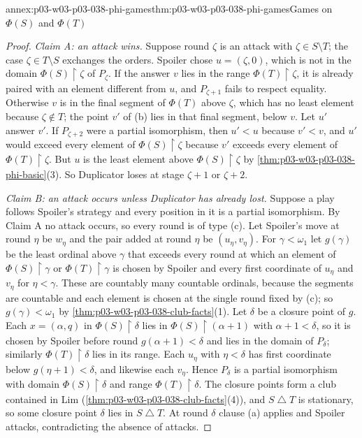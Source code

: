 \begin{annexitem}{annex:p03-w03-p03-038-phi-games}{thm:p03-w03-p03-038-phi-games}{Games on \(\Phi(S)\) and \(\Phi(T)\)}
\begin{proof}
\emph{Claim A: an attack wins.} Suppose round \(\zeta\) is an attack with
\(\zeta\in S\setminus T\); the case \(\zeta\in T\setminus S\) exchanges the
orders. Spoiler chose \(u=(\zeta,0)\), which is not in the domain
\(\Phi(S)\mathbin{\upharpoonright}\zeta\) of \(P_\zeta\). If the answer \(v\)
lies in the range \(\Phi(T)\mathbin{\upharpoonright}\zeta\), it is already
paired with an element different from \(u\), and \(P_{\zeta+1}\) fails to
respect equality. Otherwise \(v\) is in the final segment of \(\Phi(T)\) above
\(\zeta\), which has no least element because \(\zeta\notin T\); the point
\(v'\) of (b) lies in that final segment, below \(v\). Let \(u'\) answer
\(v'\). If \(P_{\zeta+2}\) were a partial isomorphism, then \(u'<u\) because
\(v'<v\), and \(u'\) would exceed every element of
\(\Phi(S)\mathbin{\upharpoonright}\zeta\) because \(v'\) exceeds every element of
\(\Phi(T)\mathbin{\upharpoonright}\zeta\). But \(u\) is the least element above
\(\Phi(S)\mathbin{\upharpoonright}\zeta\) by
\cref{thm:p03-w03-p03-038-phi-basic}(3). So Duplicator loses at stage
\(\zeta+1\) or \(\zeta+2\).

\emph{Claim B: an attack occurs unless Duplicator has already lost.} Suppose
a play follows Spoiler's strategy and every position in it is a partial
isomorphism. By Claim A no attack occurs, so every round is of type (c). Let
Spoiler's move at round \(\eta\) be \(w_\eta\) and the pair added at round
\(\eta\) be \((u_\eta,v_\eta)\). For \(\gamma<\omega_1\) let \(g(\gamma)\) be the
least ordinal above \(\gamma\) that exceeds every round at which an element of
\(\Phi(S)\mathbin{\upharpoonright}\gamma\) or \(\Phi(T)\mathbin{\upharpoonright}\gamma\)
is chosen by Spoiler and every first coordinate of \(u_\eta\) and \(v_\eta\)
for \(\eta<\gamma\). These are countably many countable ordinals, because the
segments are countable and each element is chosen at the single round fixed
by (c); so \(g(\gamma)<\omega_1\) by \cref{thm:p03-w03-p03-038-club-facts}(1).
Let \(\delta\) be a closure point of \(g\). Each \(x=(\alpha,q)\) in
\(\Phi(S)\mathbin{\upharpoonright}\delta\) lies in
\(\Phi(S)\mathbin{\upharpoonright}(\alpha+1)\) with \(\alpha+1<\delta\), so it is
chosen by Spoiler before round \(g(\alpha+1)<\delta\) and lies in the domain of
\(P_\delta\); similarly \(\Phi(T)\mathbin{\upharpoonright}\delta\) lies in its
range. Each \(u_\eta\) with \(\eta<\delta\) has first coordinate below
\(g(\eta+1)<\delta\), and likewise each \(v_\eta\). Hence \(P_\delta\) is a
partial isomorphism with domain \(\Phi(S)\mathbin{\upharpoonright}\delta\) and
range \(\Phi(T)\mathbin{\upharpoonright}\delta\). The closure points form a club
contained in \(\mathrm{Lim}\) (\cref{thm:p03-w03-p03-038-club-facts}(4)), and
\(S\mathbin{\triangle}T\) is stationary, so some closure point \(\delta\) lies in
\(S\mathbin{\triangle}T\). At round \(\delta\) clause (a) applies and Spoiler
attacks, contradicting the absence of attacks.


\end{proof}
\end{annexitem}
